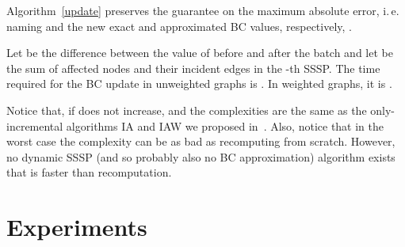\documentclass[english]{llncs}
\newcommand{\ie}{i.\,e.\xspace}
\newcommand{\vda}{\xspace}
\begin{document}
 \begin{theorem}
\label{thm:correctness_bc}
Algorithm~\ref{update} preserves the guarantee on the maximum absolute error, \ie naming  and  the new exact and approximated BC values, respectively, .

\end{theorem}
\begin{theorem}
\label{thm:complexity_bc}
Let  be the difference between the value of  before and after the batch and let  be the sum of affected nodes and their incident edges in the -th SSSP. The time required for the BC update in unweighted graphs is 
. 
In weighted graphs, it is .
\end{theorem}
Notice that, if \vda does not increase,  and the complexities are the same as the only-incremental algorithms \textsf{IA} and \textsf{IAW} we proposed in~\cite{DBLP:conf/alenex/BergaminiMS15}. Also, notice that in the worst case the complexity can be as bad as recomputing from scratch. However, no dynamic SSSP (and so probably also no BC approximation) algorithm exists that is faster than recomputation. 


\section{Experiments}
\label{sec:experimental}
\end{document}
